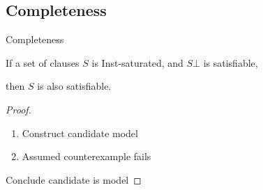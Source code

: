 \documentclass[%
handout,
]{beamer}
\begin{document}
\subsection{Completeness}
\begin{frame}{Completeness}
    
    \vspace{1.4em}

    \begin{theorem}
    If a set of clauses $S$ is Inst-saturated,
    and $S\bot$ is satisfiable,

    then $S$ is also satisfiable.
    \end{theorem}
    \vspace{1.4em}

    \begin{proof}
        \begin{enumerate}
            \item Construct candidate model
            \item Assumed counterexample fails
        \end{enumerate}
        Conclude candidate is model
        \end{proof}
\end{frame}
\end{document}
